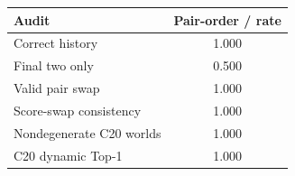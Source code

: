 \begin{tabular}{lc}
\toprule
Audit & Pair-order / rate \\
\midrule
Correct history & 1.000 \\
Final two only & 0.500 \\
Valid pair swap & 1.000 \\
Score-swap consistency & 1.000 \\
Nondegenerate C20 worlds & 1.000 \\
C20 dynamic Top-1 & 1.000 \\
\bottomrule
\end{tabular}
